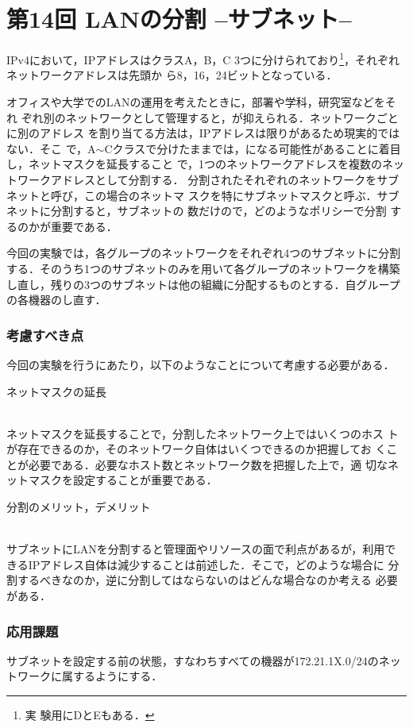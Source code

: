 \section{第14回 LANの分割 --サブネット--}

IPv4において，IPアドレスはクラスA，B，C 3つに分けられており\footnote{実
  験用にDとEもある．}，それぞれネットワークアドレスは先頭か
ら8，16，24ビットとなっている．

オフィスや大学でのLANの運用を考えたときに，部署や学科，研究室などをそれ
ぞれ別のネットワークとして管理すると，\textbf{}が抑えられる．ネットワークごとに別のアドレス
を割り当てる方法は，IPアドレスは限りがあるため現実的ではない．そこ
で，A$\sim$Cクラスで分けたままでは，\textbf{}になる可能性があることに着目し，ネットマスクを延長すること
で，1つのネットワークアドレスを複数のネットワークアドレスとして分割する．
分割されたそれぞれのネットワークをサブネットと呼び，この場合のネットマ
スクを特にサブネットマスクと呼ぶ．サブネットに分割すると，サブネットの
数だけ\textbf{}ので，どのようなポリシーで分割
するのかが重要である．

今回の実験では，各グループのネットワークをそれぞれ4つのサブネットに分割
する．そのうち1つのサブネットのみを用いて各グループのネットワークを構築
し直し，残りの3つのサブネットは他の組織に分配するものとする．自グループ
の各機器の\textbf{}し直す．

\subsubsection*{考慮すべき点}
今回の実験を行うにあたり，以下のようなことについて考慮する必要がある．
\begin{itemize}
  {\bf \item{ネットマスクの延長}}\\
  ネットマスクを延長することで，分割したネットワーク上ではいくつのホス
  トが存在できるのか，そのネットワーク自体はいくつできるのか把握してお
  くことが必要である．必要なホスト数とネットワーク数を把握した上で，適
  切なネットマスクを設定することが重要である．

  {\bf \item{分割のメリット，デメリット}}\\
  サブネットにLANを分割すると管理面やリソースの面で利点があるが，利用で
  きるIPアドレス自体は減少することは前述した．そこで，どのような場合に
  分割するべきなのか，逆に分割してはならないのはどんな場合なのか考える
  必要がある．
\end{itemize}

\subsubsection*{応用課題}
サブネットを設定する前の状態，すなわちすべての機器が172.21.1X.0/24のネッ
トワークに属するようにする．
